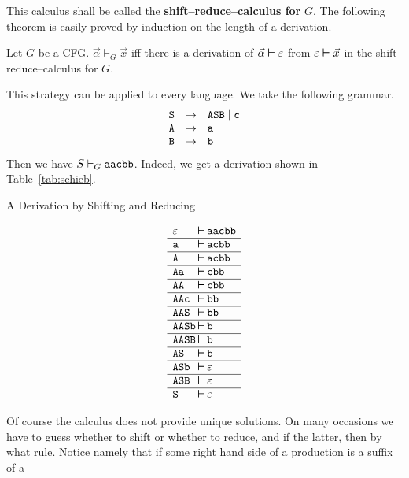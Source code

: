 This calculus shall be called the \textbf{shift--reduce--calculus for}
$G$. The following theorem is easily proved by induction on the
length of a derivation.
\begin{thm}
Let $G$ be a CFG. $\vec{\alpha} \vdash_G \vec{x}$
iff there is a derivation of $\vec{\alpha} \boldsymbol{\vdash} \varepsilon$
from $\varepsilon \boldsymbol{\vdash} \vec{x}$ in the shift--reduce--calculus
for $G$.
\end{thm}
This strategy can be applied to every language. We take the
following grammar.
\begin{equation}
\begin{array}{l@{\quad\pf\quad}l}
\mbox{\tt S} & \mbox{\tt ASB} \mid \mbox{\tt c} \\
\mbox{\tt A} & \mbox{\tt a} \\
\mbox{\tt B} & \mbox{\tt b}
\end{array}
\end{equation}
Then we have $S \vdash_G \mbox{\tt aacbb}$. Indeed, we get
a derivation shown in Table~\ref{tab:schieb}.
\begin{table}
\caption{A Derivation by Shifting and Reducing}
\label{tab:schieb}
$$\begin{array}{l@{\,\bvdash\,}l}
\varepsilon & \mbox{\tt aacbb} \\\hline
\mbox{\tt a} & \mbox{\tt acbb} \\\hline
\mbox{\tt A} & \mbox{\tt acbb} \\\hline
\mbox{\tt Aa} & \mbox{\tt cbb} \\\hline
\mbox{\tt AA} & \mbox{\tt cbb} \\\hline
\mbox{\tt AAc} & \mbox{\tt bb} \\\hline
\mbox{\tt AAS} & \mbox{\tt bb} \\\hline
\mbox{\tt AASb} & \mbox{\tt b} \\\hline
\mbox{\tt AASB} & \mbox{\tt b} \\\hline
\mbox{\tt AS} & \mbox{\tt b} \\\hline
\mbox{\tt ASb} & \varepsilon \\\hline
\mbox{\tt ASB} & \varepsilon \\\hline
\mbox{\tt S}   & \varepsilon
\end{array}$$
\end{table}
Of course the calculus does not provide unique solutions.
On many occasions we have to guess whether to shift or whether 
to reduce, and if the latter, then by what rule. Notice namely 
that if some right hand side of a production is a suffix of a 
